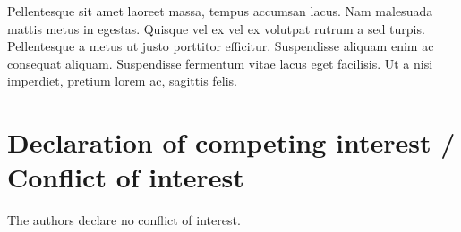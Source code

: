 \documentclass[a4paper,fleqn]{cas-dc}
\begin{document}
Pellentesque sit amet laoreet massa, tempus accumsan lacus. Nam malesuada mattis metus in egestas. Quisque vel ex vel ex volutpat rutrum a sed turpis. Pellentesque a metus ut justo porttitor efficitur. Suspendisse aliquam enim ac consequat aliquam. Suspendisse fermentum vitae lacus eget facilisis. Ut a nisi imperdiet, pretium lorem ac, sagittis felis.



\section*{Declaration of competing interest / Conflict of interest}
The authors declare no conflict of interest.




%

   




\end{document}
